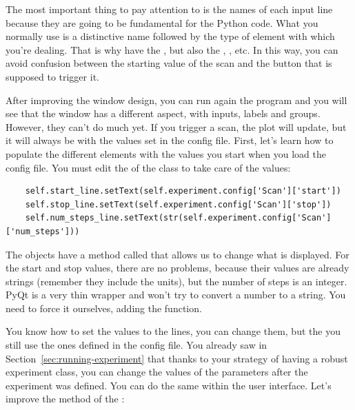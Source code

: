 The most important thing to pay attention to is the names of each input line because they are going to be fundamental for the Python code. What you normally use is a distinctive name followed by the type of element with which you're dealing. That is why have the , but also the , , etc. In this way, you can avoid confusion between the starting value of the scan and the button that is supposed to trigger it.


After improving the window design, you can run again the program and you will see that the window has a different aspect, with inputs, labels and groups. However, they can't do much yet. If you trigger a scan, the plot will update, but it will always be with the values set in the config file. First, let's learn how to populate the different elements with the values you start when you load the config file. You must edit the  of the  class to take care of the values:

\begin{verbatim}
    self.start_line.setText(self.experiment.config['Scan']['start'])
    self.stop_line.setText(self.experiment.config['Scan']['stop'])
    self.num_steps_line.setText(str(self.experiment.config['Scan'] ['num_steps']))
\end{verbatim}

The  objects have a method called  that allows us to change what is displayed. For the start and stop values, there are no problems, because their values are already strings (remember they include the units), but the number of steps is an integer. PyQt is a very thin wrapper and won't try to convert a number to a string. You need to force it ourselves, adding the  function.


You know how to set the values to the lines, you can change them, but the you still use the ones defined in the config file. You already saw in Section~\ref{sec:running-experiment} that thanks to your strategy of having a robust experiment class, you can change the values of the parameters after the experiment was defined. You can do the same within the user interface. Let's improve the  method of the :

